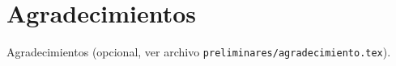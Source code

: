 

\chapter{Agradecimientos}

Agradecimientos (opcional, ver archivo \texttt{preliminares/agradecimiento.tex}).

\cleardoublepage
\endinput
